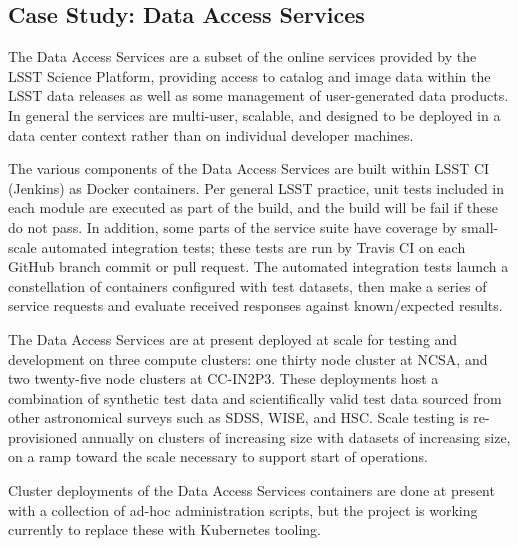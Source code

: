 \subsection{Case Study: Data Access Services}

The Data Access Services are a subset of the online services provided by the LSST Science Platform,\cite{LSE-319} providing
access to catalog and image data within the LSST data releases as well as some management of user-generated
data products.  In general the services are multi-user, scalable, and designed to be deployed in a data
center context rather than on individual developer machines.

The various components of the Data Access Services are built within LSST CI (Jenkins) as Docker containers.
Per general LSST practice, unit tests included in each module are executed as part of the build, and the build
will be fail if these do not pass.  In addition, some parts of the service suite have coverage by small-
scale automated integration tests; these tests are run by Travis CI on each GitHub branch commit or pull
request.  The automated integration tests launch a constellation of containers configured with test datasets,
then make a series of service requests and evaluate received responses against known/expected results.

The Data Access Services are at present deployed at scale for testing and development on three compute
clusters: one thirty node cluster at NCSA, and two twenty-five node clusters at CC-IN2P3.  These deployments
host a combination of synthetic test data and scientifically valid test data sourced from other astronomical
surveys such as SDSS, WISE, and HSC.  Scale testing is re-provisioned annually on clusters of increasing size
with datasets of increasing size, on a ramp toward the scale necessary to support start of operations.

Cluster deployments of the Data Access Services containers are done at present with a collection of ad-hoc
administration scripts, but the project is working currently to replace these with Kubernetes tooling.

